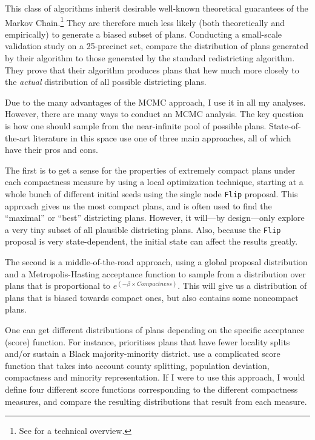 \documentclass[]{article}
\begin{document}
This class of algorithms inherit desirable well-known theoretical
guarantees of the Markov Chain.\footnote{See \cite{ddj2019recom} for a
  technical overview.} They are therefore much less likely (both
theoretically and empirically) to generate a biased subset of plans.
Conducting a small-scale validation study on a 25-precinct set,
\citeauthor{fifieldwp} compare the distribution of plans generated by
their algorithm to those generated by the standard redistricting
algorithm. They prove that their algorithm produces plans that hew much
more closely to the \emph{actual} distribution of all possible
districting plans.

Due to the many advantages of the MCMC approach, I use it in all my
analyses. However, there are many ways to conduct an MCMC analysis. The
key question is how one should sample from the near-infinite pool of
possible plans. State-of-the-art literature in this space use one of
three main approaches, all of which have their pros and cons.

The first is to get a sense for the properties of extremely compact
plans under each compactness measure by using a local optimization
technique, starting at a whole bunch of different initial seeds using
the single node \texttt{Flip} proposal. This approach gives us the most
compact plans, and is often used to find the ``maximal'' or ``best''
districting plans. However, it will---by design---only explore a very
tiny subset of all plausible districting plans. Also, because the
\texttt{Flip} proposal is very state-dependent, the initial state can
affect the results greatly.

The second is a middle-of-the-road approach, using a global proposal
distribution and a Metropolis-Hasting acceptance function to sample from
a distribution over plans that is proportional to
\(e^{(-\beta \times Compactness)}\). This will give us a distribution of
plans that is biased towards compact ones, but also contains some
noncompact plans.

One can get different distributions of plans depending on the specific
acceptance (score) function. For instance, \cite{dd2019va} prioritises
plans that have fewer locality splits and/or sustain a Black
majority-minority district. \cite{h2018} use a complicated score
function that takes into account county splitting, population deviation,
compactness and minority representation. If I were to use this approach,
I would define four different score functions corresponding to the
different compactness measures, and compare the resulting distributions
that result from each measure.
\end{document}
